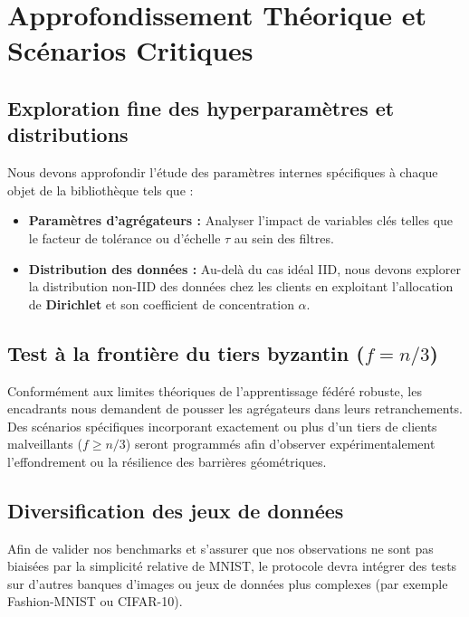 \documentclass[11pt, a4paper]{article}
\begin{document}
\section{Approfondissement Théorique et Scénarios Critiques}

\subsection{Exploration fine des hyperparamètres et distributions}
Nous devons approfondir l'étude des paramètres internes spécifiques à chaque objet de la bibliothèque tels que :
\begin{itemize}
    \item \textbf{Paramètres d'agrégateurs :} Analyser l'impact de variables clés telles que le facteur de tolérance ou d'échelle $\tau$ au sein des filtres.
    \item \textbf{Distribution des données :} Au-delà du cas idéal IID, nous devons explorer la distribution non-IID des données chez les clients en exploitant l'allocation de \textbf{Dirichlet} et son coefficient de concentration $\alpha$. %
\end{itemize}

\subsection{Test à la frontière du tiers byzantin ($f = n/3$)}
Conformément aux limites théoriques de l'apprentissage fédéré robuste, les encadrants nous demandent de pousser les agrégateurs dans leurs retranchements. Des scénarios spécifiques incorporant exactement ou plus d'un tiers de clients malveillants ($f \ge n/3$) seront programmés afin d'observer expérimentalement l'effondrement ou la résilience des barrières géométriques.

\subsection{Diversification des jeux de données}
Afin de valider nos benchmarks et s'assurer que nos observations ne sont pas biaisées par la simplicité relative de MNIST, le protocole devra intégrer des tests sur d'autres banques d'images ou jeux de données plus complexes (par exemple Fashion-MNIST ou CIFAR-10).
\end{document}
